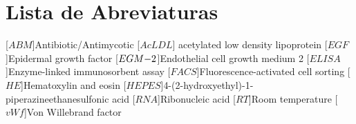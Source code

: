 \clearpage
\chapter*{\textbf{Lista de Abreviaturas}}\label{abblist}
\begin{acronym}[YTM]
\setlength{\itemsep}{-\parsep}

[$ABM$]{\hspace{1.9cm}Antibiotic/Antimycotic}
[$AcLDL$]{\hspace{1.5cm} acetylated low density lipoprotein}
[$EGF$]{\hspace{2cm}Epidermal growth factor}
[$EGM\small{-2}$]{\hspace{1.38cm}Endothelial cell growth medium 2}
[$ELISA$]{\hspace{1.62cm}Enzyme-linked immunosorbent assay}
[$FACS$]{\hspace{1.75cm}Fluorescence-activated cell sorting}
[$HE$]{\hspace{2cm}Hematoxylin and eosin}
[$HEPES$]{\hspace{1.42cm}4-(2-hydroxyethyl)-1-piperazineethanesulfonic acid}
[$RNA$]{\hspace{2cm}Ribonucleic acid}
[$RT$]{\hspace{2cm}Room temperature}
[$vWf$]{\hspace{2cm}Von Willebrand factor}


\end{acronym}

